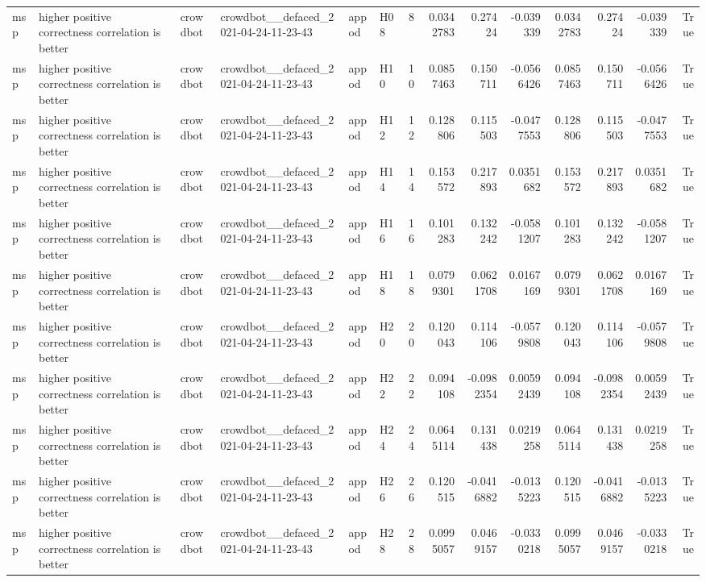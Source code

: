 \begin{longtable}{llllllrrrrrrrr}
msp & higher positive correctness correlation is better & crowdbot & crowdbot\_\_defaced\_2021-04-24-11-23-43 & appod & H08 & 8 & 0.0342783 & 0.27424 & -0.039339 & 0.0342783 & 0.27424 & -0.039339 & True \\
msp & higher positive correctness correlation is better & crowdbot & crowdbot\_\_defaced\_2021-04-24-11-23-43 & appod & H10 & 10 & 0.0857463 & 0.150711 & -0.0566426 & 0.0857463 & 0.150711 & -0.0566426 & True \\
msp & higher positive correctness correlation is better & crowdbot & crowdbot\_\_defaced\_2021-04-24-11-23-43 & appod & H12 & 12 & 0.128806 & 0.115503 & -0.0477553 & 0.128806 & 0.115503 & -0.0477553 & True \\
msp & higher positive correctness correlation is better & crowdbot & crowdbot\_\_defaced\_2021-04-24-11-23-43 & appod & H14 & 14 & 0.153572 & 0.217893 & 0.0351682 & 0.153572 & 0.217893 & 0.0351682 & True \\
msp & higher positive correctness correlation is better & crowdbot & crowdbot\_\_defaced\_2021-04-24-11-23-43 & appod & H16 & 16 & 0.101283 & 0.132242 & -0.0581207 & 0.101283 & 0.132242 & -0.0581207 & True \\
msp & higher positive correctness correlation is better & crowdbot & crowdbot\_\_defaced\_2021-04-24-11-23-43 & appod & H18 & 18 & 0.0799301 & 0.0621708 & 0.0167169 & 0.0799301 & 0.0621708 & 0.0167169 & True \\
msp & higher positive correctness correlation is better & crowdbot & crowdbot\_\_defaced\_2021-04-24-11-23-43 & appod & H20 & 20 & 0.120043 & 0.114106 & -0.0579808 & 0.120043 & 0.114106 & -0.0579808 & True \\
msp & higher positive correctness correlation is better & crowdbot & crowdbot\_\_defaced\_2021-04-24-11-23-43 & appod & H22 & 22 & 0.094108 & -0.0982354 & 0.00592439 & 0.094108 & -0.0982354 & 0.00592439 & True \\
msp & higher positive correctness correlation is better & crowdbot & crowdbot\_\_defaced\_2021-04-24-11-23-43 & appod & H24 & 24 & 0.0645114 & 0.131438 & 0.0219258 & 0.0645114 & 0.131438 & 0.0219258 & True \\
msp & higher positive correctness correlation is better & crowdbot & crowdbot\_\_defaced\_2021-04-24-11-23-43 & appod & H26 & 26 & 0.120515 & -0.0416882 & -0.0135223 & 0.120515 & -0.0416882 & -0.0135223 & True \\
msp & higher positive correctness correlation is better & crowdbot & crowdbot\_\_defaced\_2021-04-24-11-23-43 & appod & H28 & 28 & 0.0995057 & 0.0469157 & -0.0330218 & 0.0995057 & 0.0469157 & -0.0330218 & True \\

\end{longtable}
